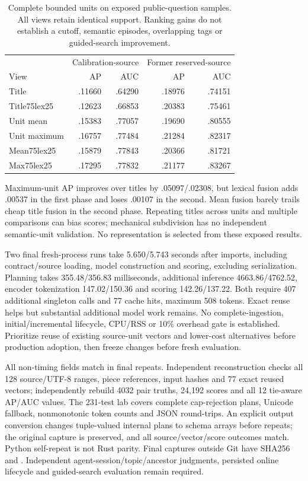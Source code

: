 \documentclass[11pt]{article}
\begin{document}
\begin{table}[ht]
\centering\small
\begin{tabular}{lrrrr}
\toprule
 & \multicolumn{2}{c}{Calibration-source} & \multicolumn{2}{c}{Former reserved-source}\\
View & AP & AUC & AP & AUC\\
\midrule
Title & .11660 & .64290 & .18976 & .74151\\
Title75lex25 & .12623 & .66853 & .20383 & .75461\\
Unit mean & .15383 & .77057 & .19690 & .80555\\
Unit maximum & .16757 & .77484 & .21284 & .82317\\
Mean75lex25 & .15879 & .77843 & .20366 & .81721\\
Max75lex25 & .17295 & .77832 & .21177 & .83267\\
\bottomrule
\end{tabular}
\caption{Complete bounded units on exposed public-question samples. All views
retain identical support. Ranking gains do not establish a cutoff, semantic
episodes, overlapping tags or guided-search improvement.}
\end{table}

Maximum-unit AP improves over titles by .05097/.02308, but lexical fusion adds
.00537 in the first phase and loses .00107 in the second. Mean fusion barely
trails cheap title fusion in the second phase. Repeating titles across units and
multiple comparisons can bias scores; mechanical subdivision has no independent
semantic-unit validation. No representation is selected from these exposed results.

Two final fresh-process runs take 5.650/5.743 seconds after imports, including
contract/source loading, model construction and scoring, excluding serialization.
Planning takes 355.48/356.83 milliseconds, additional inference 4663.86/4762.52,
encoder tokenization 147.02/150.36 and scoring 142.26/137.22. Both require 407
additional singleton calls and 77 cache hits, maximum 508 tokens. Exact reuse
helps but substantial additional model work remains. No complete-ingestion,
initial/incremental lifecycle, CPU/RSS or 10\% overhead gate is established.
Prioritize reuse of existing source-unit vectors and lower-cost alternatives
before production adoption, then freeze changes before fresh evaluation.

All non-timing fields match in final repeats. Independent reconstruction checks
all 128 source/UTF-8 ranges, piece references, input hashes and 77 exact reused
vectors; independently rebuild 4032 pair truths, 24,192 scores and all 12 tie-aware
AP/AUC values. The 231-test lab covers complete cap-rejection plans, Unicode
fallback, nonmonotonic token counts and JSON round-trips. An explicit output
conversion changes tuple-valued internal plans to schema arrays before repeats;
the original capture is preserved, and all source/vector/score outcomes match.
Python self-repeat is not Rust parity. Final captures outside Git have SHA256
and .
Independent agent-session/topic/ancestor judgments, persisted online lifecycle
and guided-search evaluation remain required.
\end{document}
